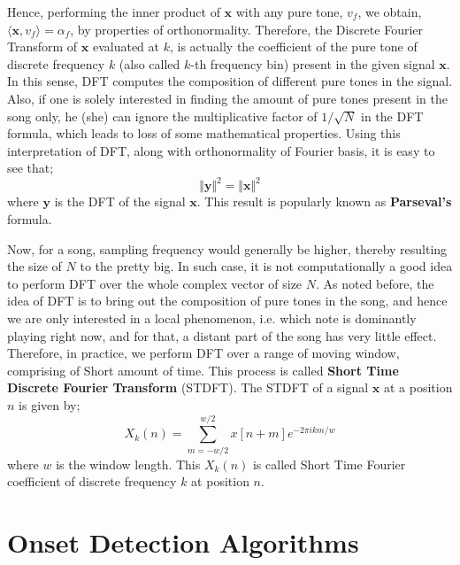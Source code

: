 \documentclass[10pt]{article}
\begin{document}
Hence, performing the inner product of $\textbf{x}$ with any pure tone, $v_f$, we obtain, $\langle \textbf{x}, v_f\rangle = \alpha_f$, by properties of orthonormality. Therefore, the Discrete Fourier Transform of $\textbf{x}$ evaluated at $k$, is actually the coefficient of the pure tone of discrete frequency $k$ (also called $k$-th frequency bin) present in the given signal $\textbf{x}$. In this sense, DFT computes the composition of different pure tones in the signal. Also, if one is solely interested in finding the amount of pure tones present in the song only, he (she) can ignore the multiplicative factor of $1/\sqrt{N}$ in the DFT formula, which leads to loss of some mathematical properties. Using this interpretation of DFT, along with orthonormality of Fourier basis, it is easy to see that;
$$\Vert \textbf{y}\Vert^2 = \Vert \textbf{x} \Vert^2$$
where $\textbf{y}$ is the DFT of the signal $\textbf{x}$. This result is popularly known as \textbf{Parseval's} formula.

Now, for a song, sampling frequency would generally be higher, thereby resulting the size of $N$ to the pretty big. In such case, it is not computationally a good idea to perform DFT over the whole complex vector of size $N$. As noted before, the idea of DFT is to bring out the composition of pure tones in the song, and hence we are only interested in a local phenomenon, i.e. which note is dominantly playing right now, and for that, a distant part of the song has very little effect. Therefore, in practice, we perform DFT over a range of moving window, comprising of Short amount of time. This process is called \textbf{Short Time Discrete Fourier Transform} (STDFT). The STDFT of a signal $\textbf{x}$ at a position $n$ is given by;
$$X_k(n) = \sum_{m= -w/2}^{w/2}x[n+m]e^{-2\pi i km/w}$$
where $w$ is the window length. This $X_k(n)$ is called Short Time Fourier coefficient of discrete frequency $k$ at position $n$.







\section{Onset Detection Algorithms}

\end{document}
